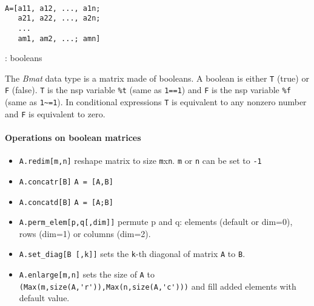 
\begin{mandesc}
   \\
\end{mandesc}
\begin{calling_sequence}
\begin{verbatim}
A=[a11, a12, ..., a1n;
   a21, a22, ..., a2n;
   ...
   am1, am2, ...; amn]
\end{verbatim}
\end{calling_sequence}
\begin{parameters}
  \begin{varlist}
    : booleans
  \end{varlist}
\end{parameters}

\begin{mandescription}
The \emph{Bmat} data type is a matrix made of booleans. 
A boolean is either \verb+T+ (true) or \verb+F+ (false). 
\verb+T+ is the nsp variable \verb+%t+ (same as \verb+1==1+)
and \verb+F+ is the nsp variable \verb+%f+ (same as \verb+1~=1+).
In conditional expressions \verb+T+ is equivalent to any nonzero
number and \verb+F+ is equivalent to zero.
\end{mandescription}

\paragraph{Operations on boolean matrices}
\begin{itemize}
\item \verb+A.redim[m,n]+ reshape matrix to size \verb+m+x\verb+n+. \verb+m+ or \verb+n+ can be set to \verb+-1+
\item \verb+A.concatr[B]+ \verb+A = [A,B]+
\item \verb+A.concatd[B]+ \verb+A = [A;B]+
\item \verb+A.perm_elem[p,q[,dim]]+ permute p and q: elements
  (default or dim=0), rows (dim=1) or columns (dim=2).
\item \verb+A.set_diag[B [,k]]+ sets the \verb+k+-th diagonal of matrix \verb+A+ to \verb+B+.
\item \verb+A.enlarge[m,n]+ sets the size of \verb+A+ to \verb+(Max(m,size(A,'r')),Max(n,size(A,'c')))+ and fill 
  added elements with default value.
\end{itemize}

